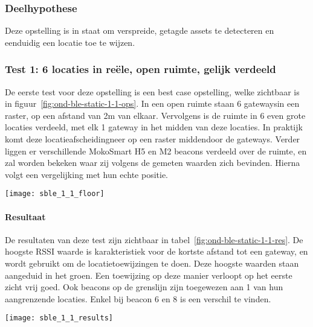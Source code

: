 \subsubsection{Deelhypothese}
Deze opstelling is in staat om verspreide, getagde assets te detecteren en eenduidig een locatie toe te wijzen.

\subsubsection{Test 1: 6 locaties in reële, open ruimte, gelijk verdeeld}
\label{sec:ond-ble-1-1}
\begin{minipage}{0.55\textwidth}
De eerste test voor deze opstelling is een best case opstelling, welke zichtbaar is in figuur~\ref{fig:ond-ble-static-1-1-ops}. In een open ruimte staan 6 gateways\footnotemark in een raster, op een afstand van 2m van elkaar. Vervolgens is de ruimte in 6 even grote locaties verdeeld, met elk 1 gateway in het midden van deze locaties. In praktijk komt deze locatieafscheiding\footnotemark neer op een raster middendoor de gateways. Verder liggen er verschillende MokoSmart H5 en M2 beacons verdeeld over de ruimte\footnotemark, en zal worden bekeken waar zij volgens de gemeten waarden zich bevinden. Hierna volgt een vergelijking met hun echte positie.
\end{minipage}
\hfill
\begin{minipage}{0.42\textwidth}
	\texttt{[image: sble\_1\_1\_floor]}
	\label{fig:ond-ble-static-1-1-ops}
\end{minipage}

\paragraph{Resultaat}
\begin{minipage}{0.55\textwidth}
De resultaten van deze test zijn zichtbaar in tabel~\ref{fig:ond-ble-static-1-1-res}. De hoogste RSSI waarde is karakteristiek voor de kortste afstand tot een gateway, en wordt gebruikt om de locatietoewijzingen te doen. Deze hoogste waarden staan aangeduid in het groen. Een toewijzing op deze manier verloopt op het eerste zicht vrij goed. Ook beacons op de grenslijn zijn toegewezen aan 1 van hun aangrenzende locaties. Enkel bij beacon 6 en 8 is een verschil te vinden.
\end{minipage}
\hfill
\begin{minipage}{0.42\textwidth}
	\texttt{[image: sble\_1\_1\_results]}
	\label{fig:ond-ble-static-1-1-res}
\end{minipage}

